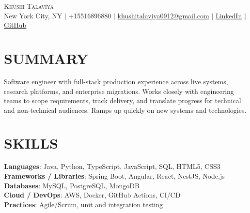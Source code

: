 \documentclass[letterpaper,11pt]{article}
\begin{document}
\begin{center}
    {\Huge \scshape Khushi Talaviya} \\ \vspace{2pt}
    \vspace{4pt}
    \small
    New York City, NY $|$
    \small
    +15516896880 $|$
    \href{mailto:khushitalaviya0912@gmail.com}{khushitalaviya0912@gmail.com} $|$
    \href{https://www.linkedin.com/in/khushitalaviya/}{LinkedIn} $|$
    \href{https://github.com/talaviyakhushi}{GitHub}
\end{center}

\section{SUMMARY}
\vspace{5pt}
\small{Software engineer with full-stack production experience across live systems, research platforms, and enterprise migrations. Works closely with engineering teams to scope requirements, track delivery, and translate progress for technical and non-technical audiences. Ramps up quickly on new systems and technologies.}

\vspace{2pt}
\section{SKILLS}
\vspace{5pt}
\begin{itemize}[leftmargin=0in, label={}]
\small{\item{
\textbf{Languages}{: Java, Python, TypeScript, JavaScript, SQL, HTML5, CSS3} \\
\textbf{Frameworks / Libraries}{: Spring Boot, Angular, React, NestJS, Node.js} \\
\textbf{Databases}{: MySQL, PostgreSQL, MongoDB} \\
\textbf{Cloud / DevOps}{: AWS, Docker, GitHub Actions, CI/CD} \\
\textbf{Practices}{: Agile/Scrum, unit and integration testing}
}}
\end{itemize}
\vspace{-10pt}

\end{document}
